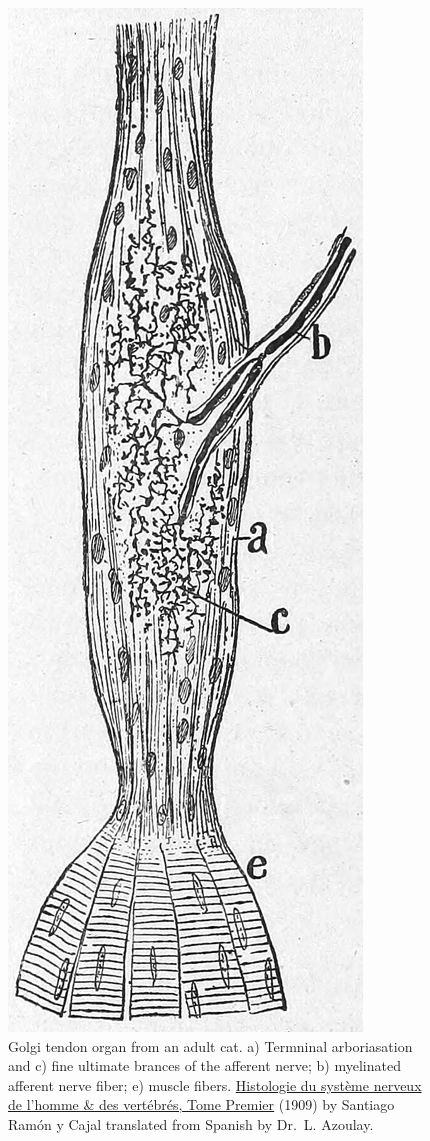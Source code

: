\begin{figure}

{\centering \includegraphics[width=0.7\linewidth]{./figures/somatosensory/CajalGolgiTendon} 

}

\caption{Golgi tendon organ from an adult cat. a) Termninal arboriasation and c) fine ultimate brances of the afferent nerve; b) myelinated afferent nerve fiber; e) muscle fibers. \href{https://wellcomelibrary.org/item/b2129592x\#?c=0\&m=0\&s=0\&cv=14\&z=0\%2C-3.48\%2C1\%2C8.6591}{Histologie du système nerveux de l'homme \& des vertébrés, Tome Premier} (1909) by Santiago Ramón y Cajal translated from Spanish by Dr.~L. Azoulay.}\label{fig:tendonorgan}
\end{figure}

